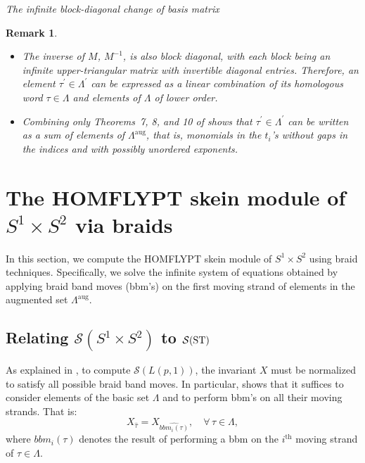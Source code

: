 \documentclass[11pt]{amsart}
\newtheorem{remark}{Remark}
\begin{document}
\begin{center}
\textit{The infinite block-diagonal change of basis matrix}
\end{center}

\begin{remark}\label{rem2}\rm
\begin{itemize}
\item[(i)] The inverse of \(M\), \(M^{-1}\), is also block diagonal, with each block being an infinite upper-triangular matrix with invertible diagonal entries. Therefore, an element \(\tau^{\prime} \in \Lambda^{\prime}\) can be expressed as a linear combination of its homologous word \(\tau \in \Lambda\) and elements of \(\Lambda\) of lower order.
\item[(ii)] Combining only Theorems~7, 8, and 10 of \cite{DL2} shows that \(\tau^{\prime} \in \Lambda^{\prime}\) can be written as a sum of elements of \(\Lambda^{\text{aug}}\), that is, monomials in the \(t_i\)'s without gaps in the indices and with possibly unordered exponents.
\end{itemize}
\end{remark}





\section{The HOMFLYPT skein module of \(S^1 \times S^2\) via braids}\label{HOMS}

In this section, we compute the HOMFLYPT skein module of \(S^1 \times S^2\) using braid techniques. Specifically, we solve the infinite system of equations obtained by applying braid band moves (bbm's) on the first moving strand of elements in the augmented set \(\Lambda^{\text{aug}}\).

\subsection{Relating \(\mathcal{S}(S^1\times S^2)\) to \(\mathcal{S}({\rm ST})\)}

As explained in \cite{DLP}, to compute \(\mathcal{S}(L(p, 1))\), the invariant \(X\) must be normalized to satisfy all possible braid band moves. In particular, \cite{DLP} shows that it suffices to consider elements of the basic set \(\Lambda\) and to perform bbm's on all their moving strands. That is:
\[
X_{\widehat{\tau}} = X_{\widehat{bbm_i(\tau)}}, \quad \forall\, \tau \in \Lambda,
\]
where \(bbm_i(\tau)\) denotes the result of performing a bbm on the \(i^\text{th}\) moving strand of \(\tau \in \Lambda\).
\end{document}
